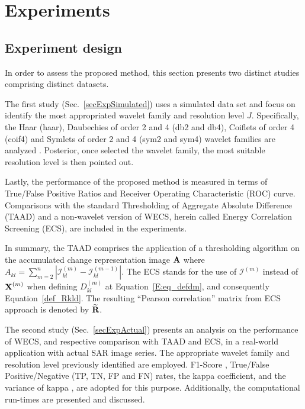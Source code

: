 \documentclass[journal]{IEEEtran}
\newcommand{\vA}{{\textbf A}}
\newcommand{\vR}{{\textbf R}}
\newcommand{\vX}{{\textbf X}}
\begin{document}
\section{Experiments}\label{secExperiments}

\subsection{Experiment design}\label{secExpDesign}

In order to assess the proposed method, this section presents two distinct studies comprising distinct datasets.

The first study (Sec.~\ref{secExpSimulated}) uses a simulated data set and focus on identify the most appropriated wavelet family and resolution level $J$. Specifically, the Haar (haar), Daubechies of order 2 and 4 (db2 and db4), Coiflets of order 4 (coif4) and Symlets of order 2 and 4 (sym2 and sym4) wavelet families are analyzed \cite{BeylkinEA1991,Daubechies1992}. 
Posterior, once selected the wavelet family, the most suitable resolution level is then pointed out.

Lastly, the performance of the proposed method is measured in terms of True/False Positive Ratios and Receiver Operating Characteristic (ROC) curve. 
Comparisons with the standard Thresholding of Aggregate Absolute Difference (TAAD) and a non-wavelet version of WECS, herein called Energy Correlation Screening (ECS), are included in the experiments. 


In summary, the TAAD comprises the application of a thresholding algorithm on the accumulated change representation image $\vA$ where $A_{kl} = \sum_{m=2}^{n}|\mathcal{I}_{kl}^{(m)}-\mathcal{I}_{kl}^{(m-1)}|$. 
The ECS stands for the use of $\mathcal{I}^{(m)}$ instead of $\vX^{(m)}$ when defining $D_{kl}^{(m)}$ at Equation~\ref{E:eq_defdm}, and consequently Equation~\ref{def_Rkld}. The resulting ``Pearson correlation'' matrix from ECS approach is denoted by $\widetilde{\vR}$.


The second study (Sec.~\ref{secExpActual}) presents an analysis on the performance of WECS, and respective comparison with TAAD and ECS, in a real-world application with actual SAR image series. The appropriate wavelet family and resolution level previously identified are employed. 
F1-Score \cite{Rijsbergen1979}, True/False Positive/Negative (TP, TN, FP and FN) rates, the kappa coefficient, and the variance of kappa \cite{Congalton2019}, are adopted for this purpose. Additionally, the computational run-times are presented and discussed.
\end{document}
